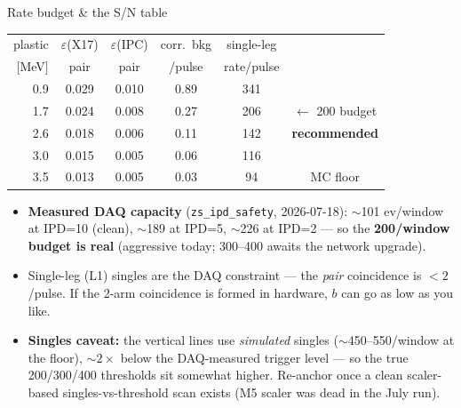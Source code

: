 \documentclass[aspectratio=169,10pt]{beamer}
\begin{document}
\begin{frame}{Rate budget \& the S/N table}
\centering
\small
\begin{tabular}{@{}rccccc@{}}
\toprule
plastic & $\varepsilon$(X17) & $\varepsilon$(IPC) & corr.\ bkg & single-leg & \\
$[$MeV$]$ & pair & pair & /pulse & rate/pulse & \\
\midrule
0.9 & 0.029 & 0.010 & 0.89 & 341 & \\
1.7 & 0.024 & 0.008 & 0.27 & 206 & $\leftarrow$ 200 budget\\
\rowcolor{green!12}
2.6 & 0.018 & 0.006 & 0.11 & 142 & \textbf{recommended}\\
3.0 & 0.015 & 0.005 & 0.06 & 116 & \\
3.5 & 0.013 & 0.005 & 0.03 & \phantom{0}94 & MC floor\\
\bottomrule
\end{tabular}
\vfill
\begin{itemize}\small
\item \textbf{Measured DAQ capacity} (\texttt{zs\_ipd\_safety}, 2026-07-18):
      $\sim$101 ev/window at IPD=10 (clean), $\sim$189 at IPD=5, $\sim$226 at
      IPD=2 --- so the \textbf{200/window budget is real} (aggressive today;
      300--400 awaits the network upgrade).
\item Single-leg (L1) singles are the DAQ constraint --- the \emph{pair}
      coincidence is $<2$/pulse. If the 2-arm coincidence is formed in
      hardware, $b$ can go as low as you like.
\item \textbf{Singles caveat:} the vertical lines use \emph{simulated} singles
      ($\sim$450--550/window at the floor), $\sim2\times$ below the DAQ-measured
      trigger level --- so the true 200/300/400 thresholds sit somewhat higher.
      Re-anchor once a clean scaler-based singles-vs-threshold scan exists
      (M5 scaler was dead in the July run).
\end{itemize}
\end{frame}
\end{document}
